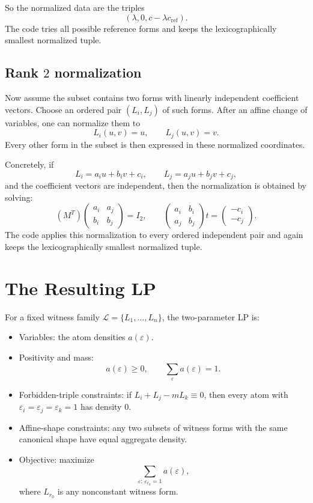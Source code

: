 \documentclass[11pt]{article}
\begin{document}
So the normalized data are the triples
\[
(\lambda,0,c-\lambda c_{\mathrm{ref}}).
\]
The code tries all possible reference forms and keeps the lexicographically smallest
normalized tuple.

\subsection*{Rank $2$ normalization}

Now assume the subset contains two forms with linearly independent coefficient
vectors. Choose an ordered pair $(L_i,L_j)$ of such forms. After an affine change
of variables, one can normalize them to
\[
L_i(u,v)=u,\qquad L_j(u,v)=v.
\]
Every other form in the subset is then expressed in these normalized coordinates.

Concretely, if
\[
L_i=a_i u+b_i v+c_i,\qquad L_j=a_j u+b_j v+c_j,
\]
and the coefficient vectors are independent, then the normalization is obtained by
solving:
\[
\left(M^T\right)
\begin{pmatrix}
a_i & a_j \\
b_i & b_j
\end{pmatrix}
= I_2,
\qquad
\begin{pmatrix}
a_i & b_i \\
a_j & b_j
\end{pmatrix}
t
=
\begin{pmatrix}
-c_i\\
-c_j
\end{pmatrix}.
\]
The code applies this normalization to every ordered independent pair and again
keeps the lexicographically smallest normalized tuple.

\section{The Resulting LP}

For a fixed witness family $\mathcal{L}=\{L_1,\dots,L_n\}$, the two-parameter LP is:

\begin{itemize}
\item Variables: the atom densities $a(\varepsilon)$.
\item Positivity and mass:
\[
a(\varepsilon)\geq 0,\qquad \sum_{\varepsilon} a(\varepsilon)=1.
\]
\item Forbidden-triple constraints: if $L_i+L_j-mL_k\equiv 0$, then every atom
with $\varepsilon_i=\varepsilon_j=\varepsilon_k=1$ has density $0$.
\item Affine-shape constraints: any two subsets of witness forms with the same
canonical shape have equal aggregate density.
\item Objective: maximize
\[
\sum_{\varepsilon:\,\varepsilon_{r_0}=1} a(\varepsilon),
\]
where $L_{r_0}$ is any nonconstant witness form.
\end{itemize}
\end{document}
